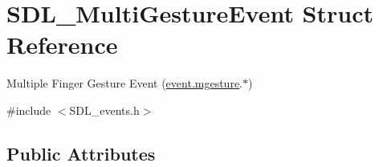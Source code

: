 \hypertarget{structSDL__MultiGestureEvent}{}\section{S\+D\+L\+\_\+\+Multi\+Gesture\+Event Struct Reference}
\label{structSDL__MultiGestureEvent}


Multiple Finger Gesture Event (\hyperlink{unionSDL__Event_ac19b3c6a6b5181a51eb4fbe2cbe726a9}{event.\+mgesture}.$\ast$)  




{\ttfamily \#include $<$S\+D\+L\+\_\+events.\+h$>$}

\subsection*{Public Attributes}
